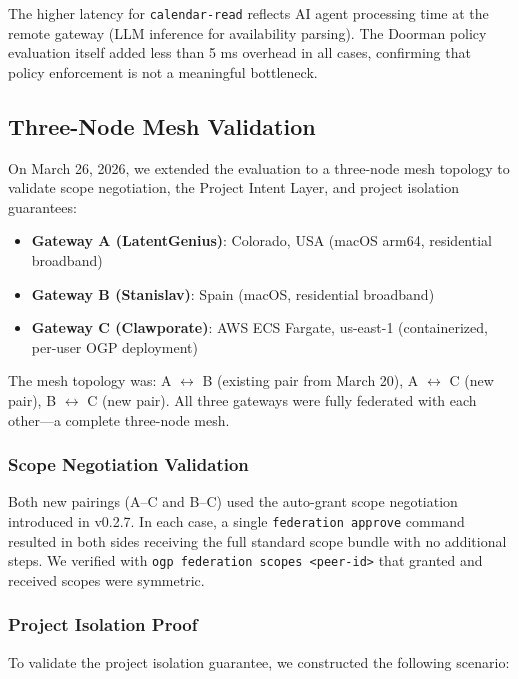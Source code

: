\documentclass[conference]{IEEEtran}
\begin{document}
The higher latency for \texttt{calendar-read} reflects AI agent processing time at the remote gateway (LLM inference for availability parsing). The Doorman policy evaluation itself added less than 5 ms overhead in all cases, confirming that policy enforcement is not a meaningful bottleneck.

\subsection{Three-Node Mesh Validation}
\label{sec:mesh-eval}

On March 26, 2026, we extended the evaluation to a three-node mesh topology to validate scope negotiation, the Project Intent Layer, and project isolation guarantees:

\begin{itemize}
  \item \textbf{Gateway A (LatentGenius)}: Colorado, USA (macOS arm64, residential broadband)
  \item \textbf{Gateway B (Stanislav)}: Spain (macOS, residential broadband)
  \item \textbf{Gateway C (Clawporate)}: AWS ECS Fargate, us-east-1 (containerized, per-user OGP deployment)
\end{itemize}

The mesh topology was: A $\leftrightarrow$ B (existing pair from March 20), A $\leftrightarrow$ C (new pair), B $\leftrightarrow$ C (new pair). All three gateways were fully federated with each other---a complete three-node mesh.

\subsubsection{Scope Negotiation Validation}

Both new pairings (A--C and B--C) used the auto-grant scope negotiation introduced in v0.2.7. In each case, a single \texttt{federation approve} command resulted in both sides receiving the full standard scope bundle with no additional steps. We verified with \texttt{ogp federation scopes <peer-id>} that granted and received scopes were symmetric.

\subsubsection{Project Isolation Proof}

To validate the project isolation guarantee, we constructed the following scenario:
\end{document}
